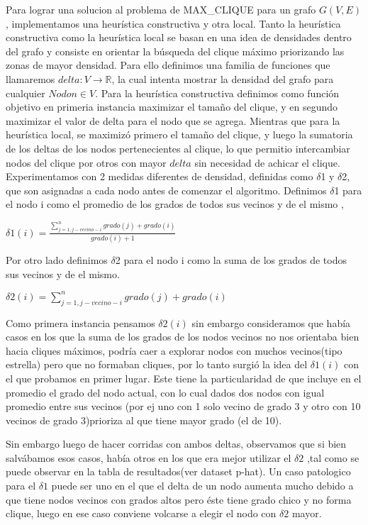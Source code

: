 Para lograr una solucion al problema de MAX_CLIQUE para un grafo $G(V,E)$, implementamos una heurística constructiva y otra local. Tanto la heurística constructiva como la heurística local se basan en una idea de densidades dentro del grafo y consiste en orientar la búsqueda del clique máximo priorizando las zonas de mayor densidad. Para ello definimos una familia de funciones que llamaremos $delta: V \longrightarrow \mathbb R$, la cual intenta mostrar la densidad del grafo para cualquier $Nodo n \in V$.
Para la heurística constructiva definimos como función objetivo en primeria instancia maximizar el tamaño del clique, y en segundo maximizar el valor de delta para el nodo que se agrega. Mientras que para la heurística local, se maximizó primero el tamaño del clique, y luego la sumatoria de los deltas de los nodos pertenecientes al clique, lo que permitio intercambiar nodos del clique por otros con mayor $delta$ sin necesidad de achicar el clique.
Experimentamos con 2 medidas diferentes de densidad, definidas como $\delta$1 y $\delta$2, que son asignadas a cada nodo antes de comenzar el algoritmo.
Definimos $\displaystyle \delta$1 para el nodo i  como el promedio de los grados de todos sus vecinos y de el mismo ,

   $\displaystyle \delta1(i) = \frac{\sum_{j=1,j-vecino-i}^{n} grado(j) + grado(i)}{grado(i)+1} $

Por otro lado definimos $\displaystyle \delta$2 para el nodo i como la suma de los grados de todos sus vecinos y de el mismo. 
	
   $\displaystyle \delta2(i) = {\sum_{j=1,j-vecino-i}^{n} grado(j) + grado(i)}$

Como primera instancia pensamos $ \delta2(i)$ sin embargo consideramos que había casos en los que la suma de los grados de los nodos vecinos no nos orientaba bien hacia cliques máximos, podría caer a explorar nodos con muchos vecinos(tipo estrella) pero que no formaban cliques, por lo tanto surgió la idea del $ \delta1(i)$ con el que probamos en primer lugar.
Este tiene la particularidad de que incluye en el promedio el grado del nodo actual, con lo cual dados dos nodos con igual promedio entre sus vecinos (por ej uno con 1 solo vecino de grado 3 y otro con 10 vecinos de grado 3)prioriza al que tiene mayor grado (el de 10). 

Sin embargo luego de hacer corridas con ambos deltas, observamos que si bien salvábamos esos casos, había otros en los que era mejor utilizar el  $ \delta2$ ,tal como se puede observar en la tabla de resultados(ver dataset p-hat). 
Un caso patologico para el $\delta1$ puede ser uno en el que el delta de un nodo aumenta mucho debido a que tiene nodos vecinos con grados altos pero éste tiene grado chico y no forma clique, luego en ese caso conviene volcarse a elegir el nodo con $ \delta2$ mayor.

